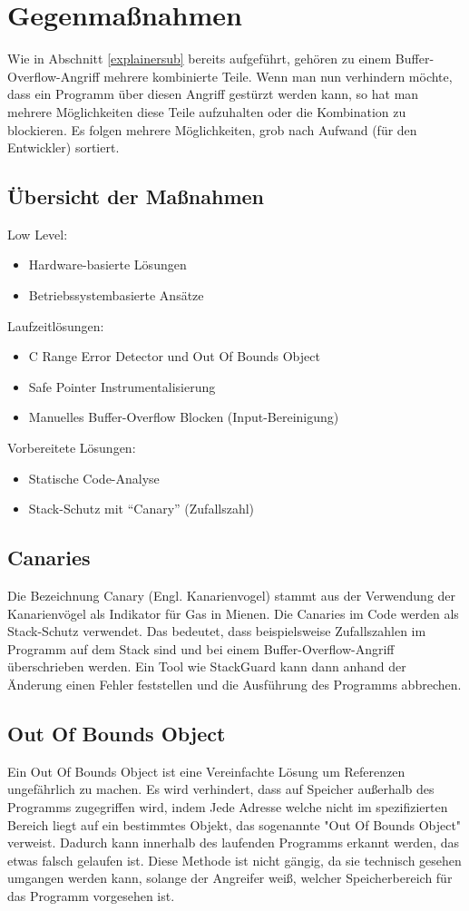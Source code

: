 \section{Gegenmaßnahmen}
Wie in Abschnitt \ref{explainersub} bereits aufgeführt,
gehören zu einem Buffer-Overflow-Angriff mehrere kombinierte Teile. Wenn
man nun verhindern möchte, dass ein Programm über diesen Angriff gestürzt werden
kann, so hat man mehrere Möglichkeiten diese Teile aufzuhalten oder die Kombination
zu blockieren. Es folgen mehrere Möglichkeiten, grob nach Aufwand (für den Entwickler) sortiert.
\subsection{Übersicht der Maßnahmen}
Low Level:
    \begin{itemize}
        \item Hardware-basierte Lösungen
        \item Betriebssystembasierte Ansätze
    \end{itemize}
Laufzeitlösungen:
    \begin{itemize}
        \item C Range Error Detector und Out Of Bounds Object
        \item Safe Pointer Instrumentalisierung
        \item Manuelles Buffer-Overflow Blocken (Input-Bereinigung)
    \end{itemize}
Vorbereitete Lösungen:
    \begin{itemize}
        \item Statische Code-Analyse
        \item Stack-Schutz mit ``Canary'' (Zufallszahl)
    \end{itemize}

\subsection{Canaries}
Die Bezeichnung Canary (Engl. Kanarienvogel) stammt aus der Verwendung der Kanarienvögel als
Indikator für Gas in Mienen. Die Canaries im Code werden als Stack-Schutz verwendet. Das bedeutet,
dass beispielsweise Zufallszahlen im Programm auf dem Stack sind und bei einem Buffer-Overflow-Angriff
überschrieben werden. Ein Tool wie StackGuard kann dann anhand der Änderung einen Fehler feststellen und
die Ausführung des Programms abbrechen.

\subsection{Out Of Bounds Object}
Ein Out Of Bounds Object ist eine Vereinfachte Lösung um Referenzen ungefährlich zu machen.
Es wird verhindert, dass auf Speicher außerhalb des Programms zugegriffen wird, indem Jede
Adresse welche nicht im spezifizierten Bereich liegt auf ein bestimmtes Objekt, das sogenannte
"Out Of Bounds Object" verweist. Dadurch kann innerhalb des laufenden Programms erkannt werden, das
etwas falsch gelaufen ist. Diese Methode ist nicht gängig, da sie technisch gesehen
umgangen werden kann, solange der Angreifer weiß, welcher Speicherbereich für das Programm
vorgesehen ist.

